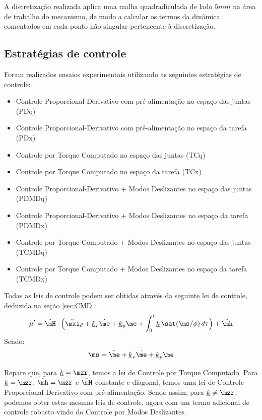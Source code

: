 \documentclass[]{politex}
\begin{document}
A discretização realizada aplica uma malha quadradiculada de lado $5mm$ na área de trabalho do mecanismo, de modo a calcular os termos da dinâmica comentados em cada ponto não singular pertencente à discretização.

\subsection{Estratégias de controle}

Foram realizados ensaios experimentais utilizando as seguintes estratégias de controle:

\begin{itemize}
\item Controle Proporcional-Derivativo com pré-alimentação no espaço das juntas (PDq)
\item Controle Proporcional-Derivativo com pré-alimentação no espaço da tarefa (PDx)
\item Controle por Torque Computado no espaço das juntas (TCq)
\item Controle por Torque Computado no espaço da tarefa (TCx)
\item Controle Proporcional-Derivativo + Modos Deslizantes no espaço das juntas (PDMDq)
\item Controle Proporcional-Derivativo + Modos Deslizantes no espaço da tarefa (PDMDx)
\item Controle por Torque Computado + Modos Deslizantes no espaço das juntas (TCMDq)
\item Controle por Torque Computado + Modos Deslizantes no espaço da tarefa (TCMDx)
\end{itemize}

Todas as leis de controle podem ser obtidas através da seguinte lei de controle, deduzida na seção \ref{sec:CMD}:
\begin{equation} \label{eq:LeiTCMD}
\mu' = \hat{\mH} \cdot \Big(\ddot{\mxi}_d + \underline{k}_v \dot{\me} + \underline{k}_p \me + \int_0^t \underline{k} \, \sat(\ms/\phi)\,d \tau \Big) + \hat{\mh}
\end{equation}
Sendo:
\begin{equation}
\ms = \ddot{\me} + \underline{k}_v \dot{\me} + \underline{k}_p \me
\end{equation}

Repare que, para $\underline{k} = \mzr$, temos a lei de Controle por Torque Computado. Para $\underline{k} = \mzr$, $\hat{\mh} = \mzr$ e $\hat{\mH}$ constante e diagonal, temos uma lei de Controle Proporcional-Derivativo com pré-alimentação. Sendo assim, para $\underline{k} \neq \mzr$, podemos obter estas mesmas leis de controle, agora com um termo adicional de controle robusto vindo do Controle por Modos Deslizantes.
\end{document}
